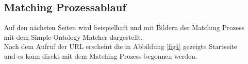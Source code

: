		\subsection{Matching Prozessablauf}
		Auf den nächsten Seiten wird beispielhaft und mit Bildern der Matching Prozess
		mit dem Simple Ontology Matcher dargestellt.\\
		Nach dem Aufruf der URL erscheint die in Abbildung \ref{fig4} gezeigte
		Startseite und es kann direkt mit dem Matching Prozess begonnen werden.\\
		\begin{minipage}{\linewidth}
			\label{fig4}
		\end{minipage}
		
		\pagebreak[4]
		
